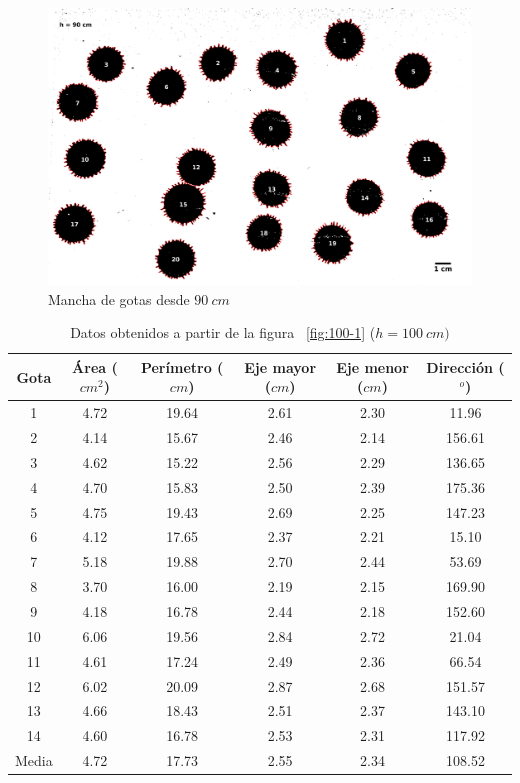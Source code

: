 \begin{figure}[H] \centering
\includegraphics[width=0.85\linewidth]{src/90-1.png} \caption{Mancha de gotas
desde $90\ cm$} \label{fig:90cm-1} \end{figure}

\begin{table}[H] \centering \caption{Datos obtenidos a partir de la figura
    ~\ref{fig:100-1} ($h=100\ cm)$} \label{tab:100} \begin{tabular}{cccccc}
        \toprule Gota & Área ($cm^2$) & Perímetro ($cm$) & Eje mayor ($cm$) &
        Eje menor ($cm$) & Dirección ($^o$) \\ \midrule 1  & 4.72 & 19.64 &
        2.61 & 2.30 & 11.96  \\ 2  & 4.14 & 15.67 & 2.46 & 2.14 & 156.61 \\ 3
             & 4.62 & 15.22 & 2.56 & 2.29 & 136.65 \\ 4  & 4.70 & 15.83 & 2.50
             & 2.39 & 175.36 \\ 5  & 4.75 & 19.43 & 2.69 & 2.25 & 147.23 \\ 6
             & 4.12 & 17.65 & 2.37 & 2.21 & 15.10  \\ 7  & 5.18 & 19.88 & 2.70
             & 2.44 & 53.69  \\ 8  & 3.70 & 16.00 & 2.19 & 2.15 & 169.90 \\ 9
             & 4.18 & 16.78 & 2.44 & 2.18 & 152.60 \\ 10 & 6.06 & 19.56 & 2.84
             & 2.72 & 21.04  \\ 11 & 4.61 & 17.24 & 2.49 & 2.36 & 66.54  \\ 12
             & 6.02 & 20.09 & 2.87 & 2.68 & 151.57 \\ 13 & 4.66 & 18.43 & 2.51
             & 2.37 & 143.10 \\ 14 & 4.60 & 16.78 & 2.53 & 2.31 & 117.92 \\
    \midrule Media & 4.72 & 17.73 & 2.55 & 2.34 & 108.52 \\ \bottomrule
\end{tabular} \end{table}

